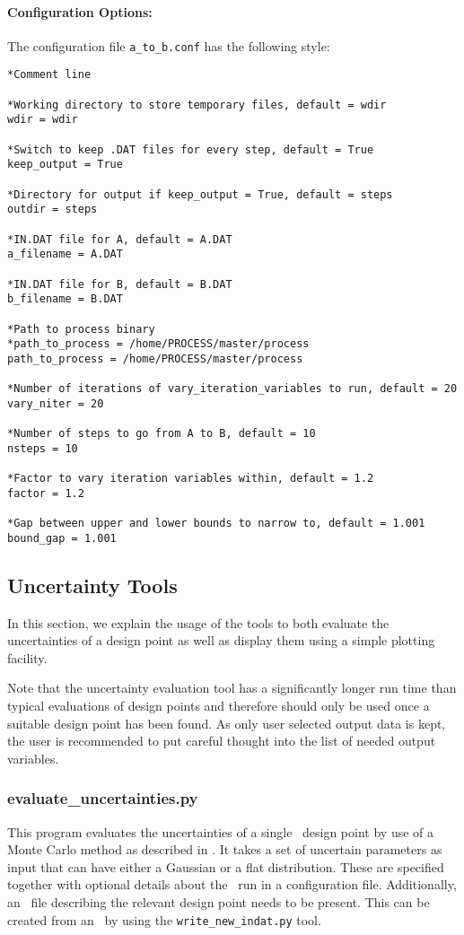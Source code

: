 \paragraph{Configuration Options:}

The configuration file \texttt{a\_to\_b.conf} has the following style:
\begin{framed}
\begin{verbatim}
*Comment line

*Working directory to store temporary files, default = wdir
wdir = wdir

*Switch to keep .DAT files for every step, default = True
keep_output = True

*Directory for output if keep_output = True, default = steps
outdir = steps

*IN.DAT file for A, default = A.DAT
a_filename = A.DAT

*IN.DAT file for B, default = B.DAT
b_filename = B.DAT

*Path to process binary
*path_to_process = /home/PROCESS/master/process
path_to_process = /home/PROCESS/master/process

*Number of iterations of vary_iteration_variables to run, default = 20
vary_niter = 20

*Number of steps to go from A to B, default = 10
nsteps = 10

*Factor to vary iteration variables within, default = 1.2
factor = 1.2

*Gap between upper and lower bounds to narrow to, default = 1.001
bound_gap = 1.001
\end{verbatim}
\end{framed}

\subsection{Uncertainty Tools}

In this section, we explain the usage of the \process\/ tools to both evaluate
the uncertainties of a design point as well as display them using a simple
plotting facility.

Note that the uncertainty evaluation tool has a significantly longer run time
than typical evaluations of \process\/ design points and therefore should only
be used once a suitable design point has been found.  As only user selected
output data is kept, the user is recommended to put careful thought into the
list of needed output variables.

\subsubsection{evaluate\_uncertainties.py}
This program evaluates the uncertainties of a single \process\ design point by
use of a Monte Carlo method as described in \cite{WPPMI2014Report}. It takes a
set of uncertain parameters as input that can have either a Gaussian or a flat
distribution. These are specified together with optional details about the
\process\ run in a configuration file. Additionally, an \indat\ file
describing the relevant design point needs to be present. This can be created
from an \mfile\ by using the \texttt{write\_new\_indat.py} tool.

